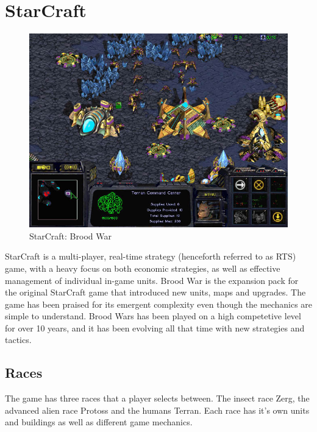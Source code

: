 
\section{StarCraft}
\label{sec:starcrafttheory}


\begin{figure}[h!tb]
\centering
\includegraphics[scale=0.5]{graphics/scbw.jpg}
\caption{StarCraft: Brood War}
\label{fig:scbwIntro}
\end{figure}

StarCraft is a multi-player, real-time strategy (henceforth referred to as RTS) game, with a heavy focus on both economic strategies, as well as effective management of individual in-game units. Brood War is the expansion pack for the original StarCraft game that introduced new units, maps and upgrades. The game has been praised for its emergent complexity even though the mechanics are simple to understand. Brood Wars has been played on a high competetive level for over 10 years, and it has been evolving all that time with new strategies and tactics.

\subsection{Races}
The game has three races that a player selects between. The insect race Zerg, the advanced alien race Protoss and the humans Terran. Each race has it's own units and buildings as well as different game mechanics. 

